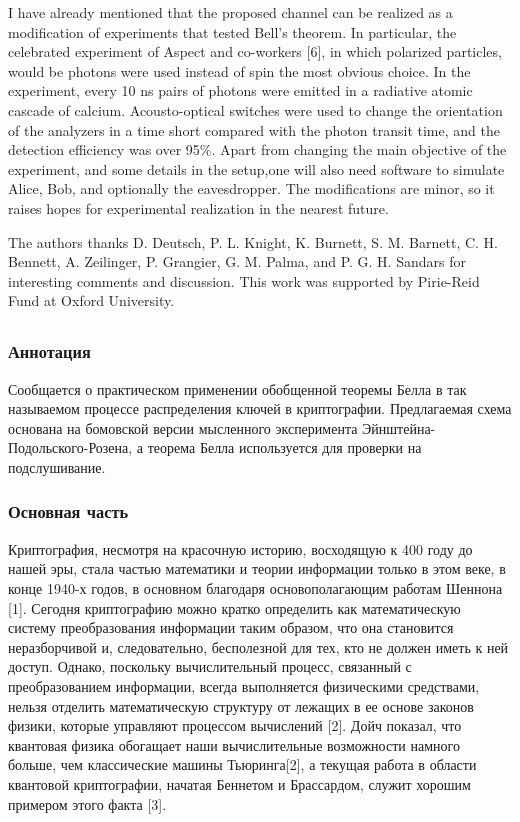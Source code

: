 I have already mentioned that the proposed channel can be realized as a modification of experiments that tested Bell's theorem. In particular, the celebrated experiment of Aspect and co-workers [6], in which polarized particles, would be photons were used instead of spin the most obvious choice. In the experiment, every 10 ns pairs of photons were emitted in a radiative atomic cascade of calcium. Acousto-optical switches were used to change the orientation of the analyzers in a time short compared with the photon transit time, and the detection efficiency was over 95\%. Apart from changing the main objective of the experiment, and some details in the setup,one will also need software to simulate Alice, Bob, and optionally the eavesdropper. The modifications are minor, so it raises hopes for experimental realization in the nearest future.

The authors thanks D. Deutsch, P. L. Knight, K. Burnett, S. M. Barnett, C. H. Bennett, A. Zeilinger, P. Grangier, G. M. Palma, and P. G. H. Sandars for interesting comments and discussion. This work was supported by Pirie-Reid Fund at Oxford University.

\subsection{\trnas}


\subsubsection*{Аннотация}

Сообщается о практическом применении обобщенной теоремы Белла в так называемом процессе распределения ключей в криптографии. Предлагаемая схема основана на бомовской версии мысленного эксперимента Эйнштейна-Подольского-Розена, а теорема Белла используется для проверки на подслушивание.

\subsubsection{Основная часть}

Криптография, несмотря на красочную историю, восходящую к 400 году до нашей эры, стала частью математики и теории информации только в этом веке, в конце 1940-х годов, в основном благодаря основополагающим работам Шеннона [1]. Сегодня криптографию можно кратко определить как математическую систему преобразования информации таким образом, что она становится неразборчивой и, следовательно, бесполезной для тех, кто не должен иметь к ней доступ. Однако, поскольку вычислительный процесс, связанный с преобразованием информации, всегда выполняется физическими средствами, нельзя отделить математическую структуру от лежащих в ее основе законов физики, которые управляют процессом вычислений [2]. Дойч показал, что квантовая физика обогащает наши вычислительные возможности намного больше, чем классические машины Тьюринга[2], а текущая работа в области квантовой криптографии, начатая Беннетом и Брассардом, служит хорошим примером этого факта [3].

